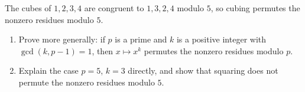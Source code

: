 The cubes of $1,2,3,4$ are congruent to $1,3,2,4$ modulo $5$, so cubing permutes the nonzero residues modulo $5$.
\begin{enumerate}
\item[(a)] Prove more generally: if $p$ is a prime and $k$ is a positive integer with $\gcd(k,p-1)=1$, then $x\mapsto x^k$ permutes the nonzero residues modulo $p$.
\item[(b)] Explain the case $p=5$, $k=3$ directly, and show that squaring does not permute the nonzero residues modulo $5$.
\end{enumerate}
